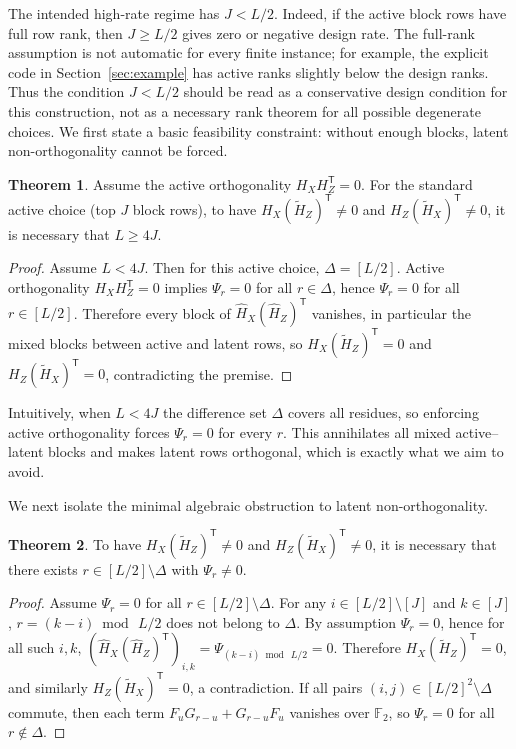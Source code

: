 \documentclass[a4paper,onecolumn,11pt,accepted=2026-08-03]{quantumarticle}
\newcommand{\Ftwo}{\mathbb{F}_2}
\newcommand{\Hful}{\hat{H}}
\newcommand{\Hres}{\tilde{H}}
\renewcommand\[{\begin{equation}}
\renewcommand\]{\end{equation}}
\theoremstyle{definition}
\newtheorem{theorem}{Theorem}[section]
\begin{document}
  The intended high-rate regime has $J<L/2$.
Indeed, if the active block rows have full row rank, then $J\ge L/2$ gives zero or negative design rate.
The full-rank assumption is not automatic for every finite instance; for example, the explicit code in Section~\ref{sec:example} has active ranks slightly below the design ranks.
Thus the condition $J<L/2$ should be read as a conservative design condition for this construction, not as a necessary rank theorem for all possible degenerate choices.
 We first state a basic feasibility constraint: without enough blocks, latent non-orthogonality cannot be forced.
\begin{theorem}
Assume the active orthogonality $H_XH_Z^{\mathsf T}=0$. For the standard active choice (top $J$ block rows), to have $H_X(\Hres_Z)^{\mathsf T}\neq 0$ and $H_Z(\Hres_X)^{\mathsf T}\neq 0$, it is necessary that $L\ge 4J$.
\end{theorem}
\begin{proof}
Assume $L<4J$. Then for this active choice, $\Delta=[L/2]$. Active orthogonality $H_XH_Z^{\mathsf T}=0$ implies $\Psi_r=0$ for all $r\in\Delta$, hence $\Psi_r=0$ for all $r\in[L/2]$. Therefore every block of $\Hful_X(\Hful_Z)^{\mathsf T}$ vanishes, in particular the mixed blocks between active and latent rows, so $H_X(\Hres_Z)^{\mathsf T}=0$ and $H_Z(\Hres_X)^{\mathsf T}=0$, contradicting the premise.
\end{proof}
Intuitively, when $L<4J$ the difference set $\Delta$ covers all residues, so enforcing active orthogonality forces $\Psi_r=0$ for every $r$. This annihilates all mixed active--latent blocks and makes latent rows orthogonal, which is exactly what we aim to avoid.

We next isolate the minimal algebraic obstruction to latent non-orthogonality.
\begin{theorem}
To have $H_X(\Hres_Z)^{\mathsf T}\neq 0$ and $H_Z(\Hres_X)^{\mathsf T}\neq 0$, it is necessary that there exists $r\in [L/2]\setminus \Delta$ with $\Psi_r\neq 0$.
\end{theorem}
\begin{proof}
Assume $\Psi_r=0$ for all $r\in [L/2]\setminus \Delta$. For any $i\in[L/2]\setminus[J]$ and $k\in[J]$, $r=(k-i)\bmod\, L/2$ does not belong to $\Delta$. By assumption $\Psi_r=0$, hence for all such $i,k$,
\(
(\Hful_X(\Hful_Z)^{\mathsf T})_{i,k}=\Psi_{(k-i)\bmod\, L/2}=0.
\)
Therefore $H_X(\Hres_Z)^{\mathsf T}=0$, and similarly $H_Z(\Hres_X)^{\mathsf T}=0$, a contradiction.
If all pairs $(i,j)\in [L/2]^2\setminus \Delta$ commute, then each term $F_uG_{r-u}+G_{r-u}F_u$ vanishes over $\Ftwo$, so $\Psi_r=0$ for all $r\notin\Delta$.
\end{proof}
\end{document}

